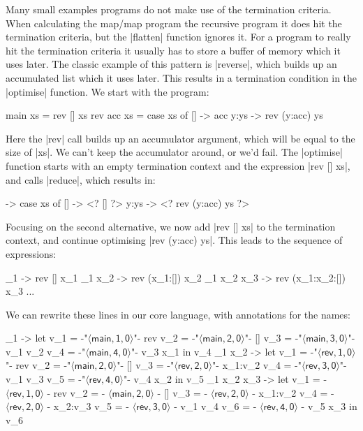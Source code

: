 \documentclass[draft]{sigplanconf}
\newcommand{\name}[3]{\ensuremath{\langle\mathsf{#1},\mathsf{#2},\mathsf{#3}\rangle}}
\begin{document}
Many small examples programs do not make use of the termination criteria. When calculating the map/map program the recursive program it does hit the termination criteria, but the |flatten| function ignores it. For a program to really hit the termination criteria it usually has to store a buffer of memory which it uses later. The classic example of this pattern is |reverse|, which builds up an accumulated list which it uses later. This results in a termination condition in the |optimise| function. We start with the program:

\begin{code}
main xs = rev [] xs
rev acc xs = case xs of
    []    -> acc
    y:ys  -> rev (y:acc) ys
\end{code}

Here the |rev| call builds up an accumulator argument, which will be equal to the size of |xs|. We can't keep the accumulator around, or we'd fail. The |optimise| function starts with an empty termination context and the expression |rev [] xs|, and calls |reduce|, which results in:

\begin{code}
\xs -> case xs of
    []    -> <? [] ?>
    y:ys  -> <? rev (y:acc) ys ?>
\end{code}

Focusing on the second alternative, we now add |rev [] xs| to the termination context, and continue optimising |rev (y:acc) ys|. This leads to the sequence of expressions:

\begin{code}
\x_1 -> rev [] x_1
\x_1 x_2 -> rev (x_1:[]) x_2
\x_1 x_2 x_3 -> rev (x_1:x_2:[]) x_3
...
\end{code}

We can rewrite these lines in our core language, with annotations for the names:

\begin{code}
\x_1 ->
    let  v_1 = {-"\name{main}{1}{0}"-}  rev
         v_2 = {-"\name{main}{2}{0}"-}  []
         v_3 = {-"\name{main}{3}{0}"-}  v_1 v_2
         v_4 = {-"\name{main}{4}{0}"-}  v_3 x_1
    in   v_4
\x_1 x_2 ->
    let  v_1 = {-"\name{rev}{1}{0}"-}   rev
         v_2 = {-"\name{main}{2}{0}"-}  []
         v_3 = {-"\name{rev}{2}{0}"-}   x_1:v_2
         v_4 = {-"\name{rev}{3}{0}"-}   v_1 v_3
         v_5 = {-"\name{rev}{4}{0}"-}   v_4 x_2
    in   v_5
\x_1 x_2 x_3 ->
    let  v_1 = {- \name{rev}{1}{0}   -} rev
         v_2 = {- \name{main}{2}{0}  -} []
         v_3 = {- \name{rev}{2}{0}   -} x_1:v_2
         v_4 = {- \name{rev}{2}{0}   -} x_2:v_3
         v_5 = {- \name{rev}{3}{0}   -} v_1 v_4
         v_6 = {- \name{rev}{4}{0}   -} v_5 x_3
    in   v_6
\end{code}
\end{document}
